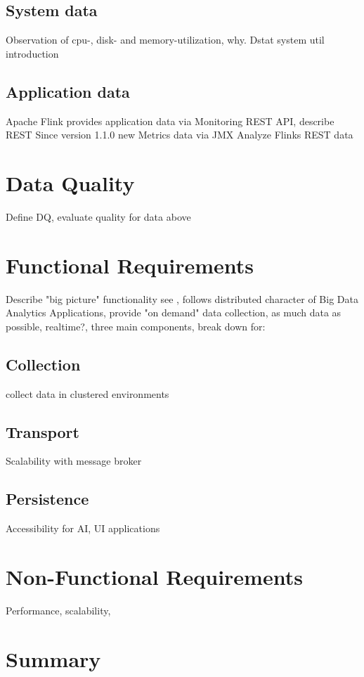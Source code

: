 \subsection{System data}

Observation of cpu-, disk- and memory-utilization, why.
Dstat system util introduction

\subsection{Application data}

Apache Flink provides application data via Monitoring REST API, describe REST
Since version 1.1.0 new Metrics data via JMX
Analyze Flinks REST data

\section{Data Quality}

Define DQ, evaluate quality for data above

\section{Functional Requirements}

Describe "big picture" functionality see \cite{VanL14}, follows distributed character of Big Data Analytics
Applications, provide "on demand" data collection, as much data as possible, realtime?, three main components,
break down for:

\subsection{Collection}

collect data in clustered environments

\subsection{Transport}

Scalability with message broker

\subsection{Persistence}

Accessibility for AI, UI applications

\section{Non-Functional Requirements}

Performance, scalability,

\section{Summary}